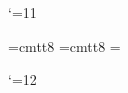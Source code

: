 

%
%
%




%
%
%
%

\catcode`\@=11\relax

\font\cellf@nt=cmtt8 %
\def\v@rbsize{\baselineskip 8pt \parskip 0pt plus 1pt \cellf@nt}
\font\b@xfont=cmtt8 %
\newbox\t@bbox \setbox\t@bbox=\hbox{\b@xfont\ }
\newdimen\w {}\wd\t@bbox%

\def\@mmatok{mathematica}
\def\begin#1{\def\testtok{#1}
	\ifx\testtok\@mmatok
		\let\next = \@mma
	\else
		\errmessage{Environment #1 undefined.}
		\let\next = \relax
	\fi
	\next}



\catcode`\@=12\relax
